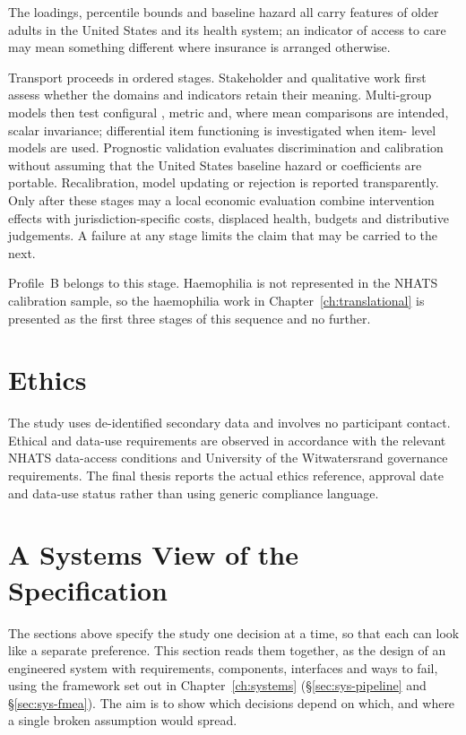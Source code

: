 The loadings, percentile bounds and baseline hazard all carry features of
older adults in the United States and its health system; an indicator of access
to care may mean something different where insurance is arranged otherwise.

Transport proceeds in ordered stages. Stakeholder and qualitative work first
assess whether the domains and indicators retain their meaning. Multi-group
models then test configural \citep{putnick_bornstein_2016}, metric and, where mean comparisons are intended,
scalar invariance; differential item functioning is investigated when item-
level models are used. Prognostic validation evaluates discrimination and
calibration without assuming that the United States baseline hazard or
coefficients are portable. Recalibration, model updating or rejection is
reported transparently. Only after these stages may a local economic evaluation
combine intervention effects with jurisdiction-specific costs, displaced
health, budgets and distributive judgements. A failure at any stage limits the
claim that may be carried to the next.

Profile~B belongs to this stage. Haemophilia is not represented in the NHATS
calibration sample, so the haemophilia work in
Chapter~\ref{ch:translational} is presented as the first three stages of this
sequence and no further.

\section{Ethics}
\label{sec:ethics}

The study uses de-identified secondary data and involves no participant contact. Ethical and data-use requirements are observed in accordance with the relevant NHATS data-access conditions and University of the Witwatersrand governance requirements. The final thesis reports the actual ethics reference, approval date and data-use status rather than using generic compliance language.

\section{A Systems View of the Specification}
\label{sec:methods-systems}

The sections above specify the study one decision at a time, so that each can look like a separate preference. This section reads them together, as the design of an engineered system with requirements, components, interfaces and ways to fail, using the framework set out in Chapter~\ref{ch:systems} (\S\ref{sec:sys-pipeline} and \S\ref{sec:sys-fmea}). The aim is to show which decisions depend on which, and where a single broken assumption would spread.

